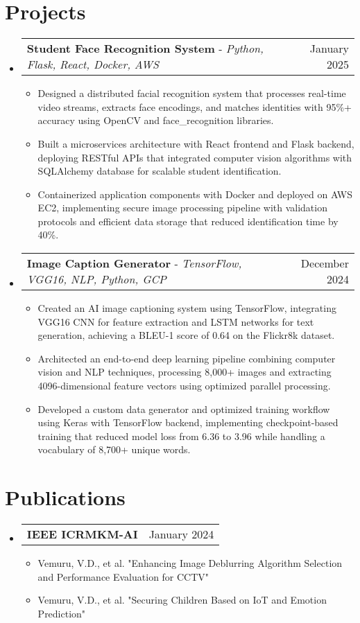 \documentclass[letterpaper,10.5pt]{article}
\makeatletter
\newcommand{\resumeItem}[1]{
  \item\small{
    {#1 \vspace{-3pt}}
  }
}
\newcommand{\resumeProjectHeading}[2]{
    \item
    \begin{tabular*}{0.97\textwidth}{l@{\extracolsep{\fill}}r}
      \small#1 & #2 \\
    \end{tabular*}\vspace{-5pt}
}
\newcommand{\resumePublicationsHeading}[2]{
    \item
    \begin{tabular*}{0.97\textwidth}{l@{\extracolsep{\fill}}r}
      \small#1 & #2 \\
    \end{tabular*}\vspace{-6pt}
}
\newcommand{\resumeSubHeadingListStart}{\begin{itemize}[leftmargin=*]}
\newcommand{\resumeSubHeadingListEnd}{\end{itemize}}
\newcommand{\resumeItemListStart}{\begin{itemize}}
\newcommand{\resumeItemListEnd}{\end{itemize}\vspace{-6pt}}
\makeatother
\begin{document}
\section{Projects}
    \resumeSubHeadingListStart
      \resumeProjectHeading
          {\textbf{Student Face Recognition System} - \emph{Python, Flask, React, Docker, AWS}}{January 2025}
          \resumeItemListStart
            \resumeItem{Designed a distributed facial recognition system that processes real-time video streams, extracts face encodings, and matches identities with 95\%+ accuracy using OpenCV and face\_recognition libraries.}
            \resumeItem{Built a microservices architecture with React frontend and Flask backend, deploying RESTful APIs that integrated computer vision algorithms with SQLAlchemy database for scalable student identification.}
            \resumeItem{Containerized application components with Docker and deployed on AWS EC2, implementing secure image processing pipeline with validation protocols and efficient data storage that reduced identification time by 40\%.}
          \resumeItemListEnd
      \resumeProjectHeading
          {\textbf{Image Caption Generator} - \emph{TensorFlow, VGG16, NLP, Python, GCP}}{December 2024}
          \resumeItemListStart
            \resumeItem{Created an AI image captioning system using TensorFlow, integrating VGG16 CNN for feature extraction and LSTM networks for text generation, achieving a BLEU-1 score of 0.64 on the Flickr8k dataset.}
            \resumeItem{Architected an end-to-end deep learning pipeline combining computer vision and NLP techniques, processing 8,000+ images and extracting 4096-dimensional feature vectors using optimized parallel processing.}
            \resumeItem{Developed a custom data generator and optimized training workflow using Keras with TensorFlow backend, implementing checkpoint-based training that reduced model loss from 6.36 to 3.96 while handling a vocabulary of 8,700+ unique words.}
          \resumeItemListEnd
    \resumeSubHeadingListEnd

\section{Publications}
    \resumeSubHeadingListStart
      \resumePublicationsHeading
          {\textbf{IEEE ICRMKM-AI}}{January 2024}
          \resumeItemListStart
            \resumeItem{Vemuru, V.D., et al. "Enhancing Image Deblurring Algorithm Selection and Performance Evaluation for CCTV"}
            \resumeItem{Vemuru, V.D., et al. "Securing Children Based on IoT and Emotion Prediction"}
          \resumeItemListEnd
    \resumeSubHeadingListEnd
\end{document}
